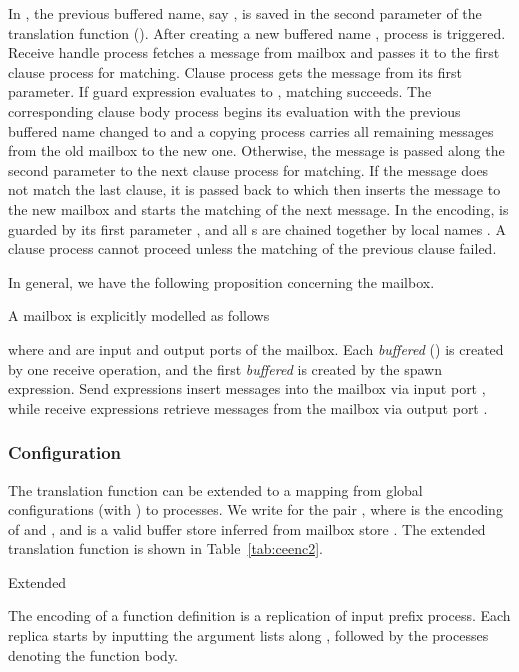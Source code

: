 \documentclass[runningheads, envcountsame, a4paper]{llncs}
\begin{document}
In , the previous buffered name, say , is saved in the second parameter of the translation function ().
After creating a new buffered name , process  is triggered.
Receive handle process  fetches a message from mailbox  and passes it to the first clause process for matching.
Clause process  gets the message from its first parameter.
If guard expression evaluates to , matching succeeds.
The corresponding clause body process begins its evaluation with the previous buffered name changed to  and a copying process  carries all remaining messages from the old mailbox to the new one.
Otherwise, the message is passed along the second parameter to the next clause process for matching.
If the message does not match the last clause, it is passed back to  which then
inserts the message to the new mailbox  and starts the matching of the next message.
In the encoding,  is guarded by its first parameter ,
and all s are chained together by local names .
A clause process cannot proceed unless the matching of the previous clause failed.

In general, we have the following proposition concerning the mailbox.
\begin{proposition}
A mailbox is explicitly modelled as follows

where  and  are input and output ports of the mailbox.
Each \emph{buffered}  () is created by one receive operation,
and the first \emph{buffered}  is created by the spawn expression.
Send expressions insert messages into the mailbox via input port ,
while receive expressions retrieve messages from the mailbox via output port .
\end{proposition}

\subsubsection{Configuration}
The translation function can be extended to a mapping from global configurations (with ) to  processes.
We write  for the pair , where  is the encoding of  and ,
and  is a valid buffer store inferred from mailbox store .
The extended translation function is shown in Table~\ref{tab:ceenc2}.

\begin{table}

\caption{Extended  }
\label{tab:ceenc2}
\end{table}

The encoding of a function definition is a replication of input prefix process.
Each replica starts by inputting the argument lists along , followed by the processes denoting the function body.
\end{document}
